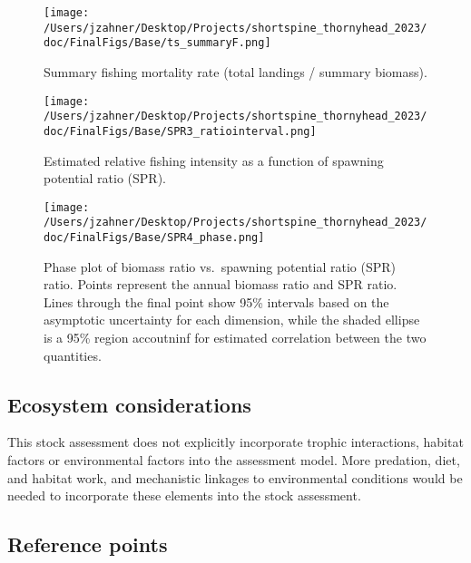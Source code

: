 \documentclass[11pt,
  english,
  letterpaper,
]{article}
\begin{document}
\begin{figure}
\centering
\texttt{[image: /Users/jzahner/Desktop/Projects/shortspine\_thornyhead\_2023/doc/FinalFigs/Base/ts\_summaryF.png]}
\caption{Summary fishing mortality rate (total landings / summary biomass).\label{fig:summary_fES}}
\end{figure}

\begin{figure}
\centering
\texttt{[image: /Users/jzahner/Desktop/Projects/shortspine\_thornyhead\_2023/doc/FinalFigs/Base/SPR3\_ratiointerval.png]}
\caption{Estimated relative fishing intensity as a function of spawning potential ratio (SPR).\label{fig:spr_trajectoryES}}
\end{figure}

\begin{figure}
\centering
\texttt{[image: /Users/jzahner/Desktop/Projects/shortspine\_thornyhead\_2023/doc/FinalFigs/Base/SPR4\_phase.png]}
\caption{Phase plot of biomass ratio vs.~spawning potential ratio (SPR) ratio. Points represent the annual biomass ratio and SPR ratio. Lines through the final point show 95\% intervals based on the asymptotic uncertainty for each dimension, while the shaded ellipse is a 95\% region accoutninf for estimated correlation between the two quantities.\label{fig:phase_diagramES}}
\end{figure}

\hypertarget{ecosystem-considerations}{%
\subsection*{Ecosystem considerations}\label{ecosystem-considerations}}

This stock assessment does not explicitly incorporate trophic interactions, habitat factors or environmental factors into the assessment model. More predation, diet, and habitat work, and mechanistic linkages to environmental conditions would be needed to incorporate these elements into the stock assessment.

\hypertarget{reference-points}{%
\subsection*{Reference points}\label{reference-points}}
\end{document}
